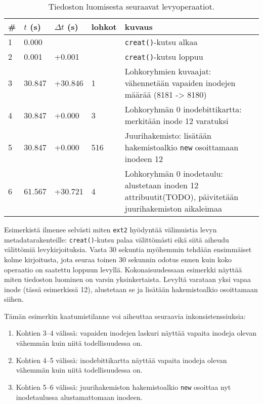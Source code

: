 \begin{table}[H]
\label{TabExt2Creation}
\begin{tabular}{l | l | l | l | p{7cm}}
    \# & $t$ (s) & $\Delta t$ (s) & lohkot & kuvaus \\ \hline \hline
    1  & 0.000    &          &     & \texttt{creat()}-kutsu alkaa   \\ \hline %
    2  & 0.001    & +0.001   &     & \texttt{creat()}-kutsu loppuu  \\ \hline %
    3  & 30.847   & +30.846  & 1   & Lohkoryhmien kuvaajat: vähennetään vapaiden inodejen määrää (8181 -> 8180)         \\ \hline %
    4  & 30.847   & +0.000   & 3   & Lohkoryhmän 0 inodebittikartta: merkitään inode 12 varatuksi \\ \hline %
    5  & 30.847   & +0.000   & 516 & Juurihakemisto: lisätään hakemistoalkio \texttt{new} osoittamaan inodeen 12                 \\ \hline %
    6  & 61.567   & +30.721  & 4   & Lohkoryhmän 0 inodetaulu: alustetaan inoden 12 attribuutit(TODO), päivitetään juurihakemiston aikaleimaa \\        %
\end{tabular}
\caption{Tiedoston luomisesta seuraavat levyoperaatiot.}
\end{table}

Esimerkistä ilmenee selvästi miten \texttt{ext2} hyödyntää välimuistia levyn metadatarakenteille: \texttt{creat()}-kutsu palaa välittömästi eikä siitä aiheudu välittömiä levykirjoituksia.
Vasta 30 sekuntia myöhemmin tehdään ensimmäiset kolme kirjoitusta,
jota seuraa toinen 30 sekunnin odotus ennen kuin koko operaatio on saatettu loppuun levyllä.
Kokonaisuudessaan esimerkki näyttää miten tiedoston luominen on varsin yksinkertaista.
Levyltä varataan yksi vapaa inode (tässä esimerkissä 12), alustetaan se ja lisätään hakemistoalkio osoittamaan siihen.

Tämän esimerkin kaatumistilanne voi aiheuttaa seuraavia inkonsistenssiuksia:
\begin{enumerate}
    \item{Kohtien 3--4 välissä: vapaiden inodejen laskuri näyttää vapaita inodeja olevan vähemmän kuin niitä todellisuudessa on.}
    \item{Kohtien 4--5 välissä: inodebittikartta näyttää vapaita inodeja olevan vähemmän kuin niitä todellisuudessa on.}
    \item{Kohtien 5--6 välissä: juurihakemiston hakemistoalkio \texttt{new} osoittaa nyt inodetaulussa alustamattomaan inodeen.}
\end{enumerate}

